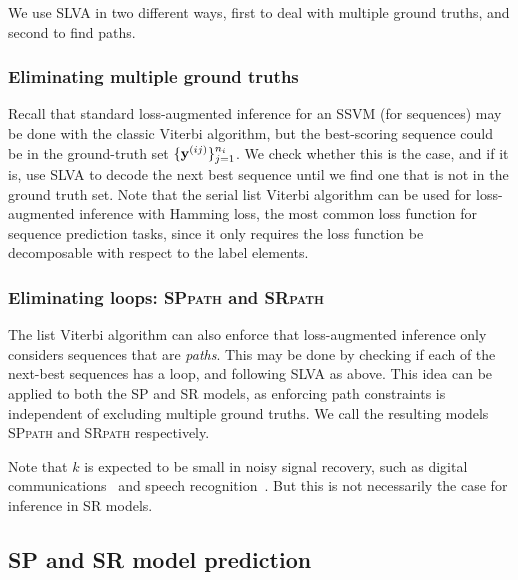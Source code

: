 We use SLVA in two different ways, first to deal with multiple ground truths, and second to find paths.


\subsubsection{Eliminating multiple ground truths}
Recall that standard loss-augmented inference for an SSVM (for sequences) may be done with the classic Viterbi algorithm, but the best-scoring sequence could be in the ground-truth set $\{\mathbf{y}^{(ij)}\}_{j=1}^{n_i}$. We check whether this is the case, and if it is, use SLVA to decode the next best sequence until we find one that is not in the ground truth set.
Note that the serial list Viterbi algorithm
can be used for loss-augmented inference with Hamming loss, the most common loss function for sequence prediction tasks,
since it only requires the loss function be decomposable with respect to the label elements.


\subsubsection{Eliminating loops: \textsc{SPpath} and \textsc{SRpath}}
The list Viterbi algorithm can also enforce that loss-augmented inference only considers sequences that are \emph{paths}. This may be done by checking if each of the next-best sequences has a loop, and following SLVA as above.
This idea can be applied to both the SP and SR models, as enforcing path constraints is independent of excluding multiple ground truths.
We call the resulting models \textsc{SPpath} and \textsc{SRpath} respectively.

Note that $k$ is expected to be small in noisy signal recovery, such as digital communications~\cite{seshadri1994list} and speech recognition~\cite{soong1991tree}. But this is not necessarily the case for inference in SR models.

\subsection{SP and SR model prediction}
\label{ssec:testing}

